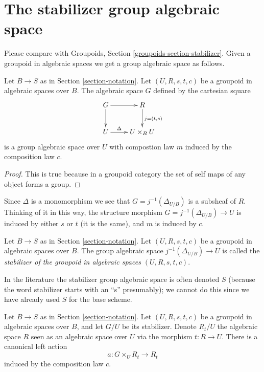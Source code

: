 \section{The stabilizer group algebraic space}
\label{section-stabilizer}

\noindent
Please compare with
Groupoids, Section \ref{groupoids-section-stabilizer}.
Given a groupoid in algebraic spaces we get a group algebraic space as follows.

\begin{lemma}
\label{lemma-groupoid-stabilizer}
Let $B \to S$ as in Section \ref{section-notation}.
Let $(U, R, s, t, c)$ be a groupoid in algebraic spaces over $B$.
The algebraic space $G$ defined by the cartesian square
$$
\xymatrix{
G \ar[r] \ar[d] & R \ar[d]^{j = (t, s)} \\
U \ar[r]^-{\Delta} & U \times_B U
}
$$
is a group algebraic space over $U$ with compostion law
$m$ induced by the composition law $c$.
\end{lemma}

\begin{proof}
This is true because in a groupoid category the
set of self maps of any object forms a group.
\end{proof}

\noindent
Since $\Delta$ is a monomorphism we see that $G = j^{-1}(\Delta_{U/B})$ is a
subsheaf of $R$. Thinking of it in this way, the structure morphism
$G = j^{-1}(\Delta_{U/B}) \to U$ is induced by either $s$ or $t$
(it is the same), and $m$ is induced by $c$.

\begin{definition}
\label{definition-stabilizer-groupoid}
Let $B \to S$ as in Section \ref{section-notation}.
Let $(U, R, s, t, c)$ be a groupoid in algebraic spaces over $B$.
The group algebraic space $j^{-1}(\Delta_{U/B}) \to U$ is called the
{\it stabilizer of the groupoid in algebraic spaces $(U, R, s, t, c)$}.
\end{definition}

\noindent
In the literature the stabilizer group algebraic space is often denoted $S$
(because the word stabilizer starts with an ``s'' presumably);
we cannot do this since we have already used $S$ for the base scheme.

\begin{lemma}
\label{lemma-groupoid-action-stabilizer}
Let $B \to S$ as in Section \ref{section-notation}.
Let $(U, R, s, t, c)$ be a groupoid in algebraic spaces over $B$, and let
$G/U$ be its stabilizer. Denote $R_t/U$ the algebraic space $R$ seen as an
algebraic space over $U$ via the morphism $t : R \to U$. There is a
canonical left action
$$
a : G \times_U R_t \longrightarrow R_t
$$
induced by the composition law $c$.
\end{lemma}

